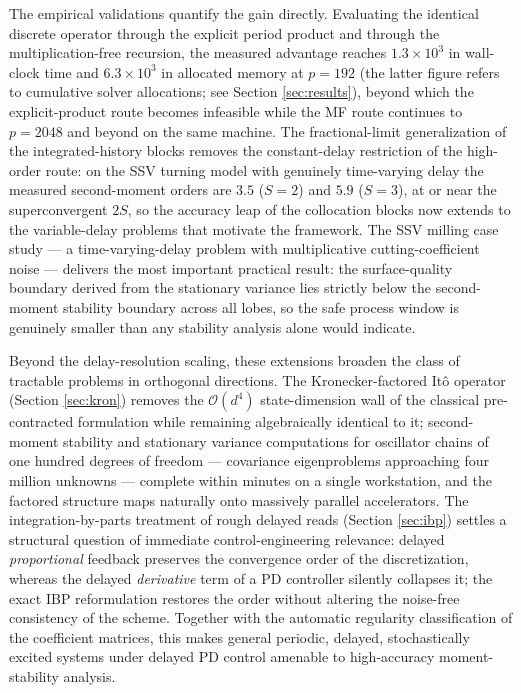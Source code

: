 \documentclass[preprint,12pt]{elsarticle}
\begin{document}
The empirical validations quantify the gain directly. Evaluating the identical discrete operator through the explicit period product and through the multiplication-free recursion, the measured advantage reaches $1.3\times10^3$ in wall-clock time and $6.3\times10^3$ in allocated memory at $p = 192$ (the latter figure refers to cumulative solver allocations; see Section \ref{sec:results}), beyond which the explicit-product route becomes infeasible while the MF route continues to $p = 2048$ and beyond on the same machine. The fractional-limit generalization of the integrated-history blocks removes the constant-delay restriction of the high-order route: on the SSV turning model with genuinely time-varying delay the measured second-moment orders are $3.5$ ($S{=}2$) and $5.9$ ($S{=}3$), at or near the superconvergent $2S$, so the accuracy leap of the collocation blocks now extends to the variable-delay problems that motivate the framework. The SSV milling case study --- a time-varying-delay problem with multiplicative cutting-coefficient noise --- delivers the most important practical result: the surface-quality boundary derived from the stationary variance lies strictly below the second-moment stability boundary across all lobes, so the safe process window is genuinely smaller than any stability analysis alone would indicate.

Beyond the delay-resolution scaling, these extensions broaden the class of tractable problems in orthogonal directions. The Kronecker-factored It\^o operator (Section \ref{sec:kron}) removes the $\mathcal{O}(d^4)$ state-dimension wall of the classical pre-contracted formulation while remaining algebraically identical to it; second-moment stability and stationary variance computations for oscillator chains of one hundred degrees of freedom --- covariance eigenproblems approaching four million unknowns --- complete within minutes on a single workstation, and the factored structure maps naturally onto massively parallel accelerators. The integration-by-parts treatment of rough delayed reads (Section \ref{sec:ibp}) settles a structural question of immediate control-engineering relevance: delayed \emph{proportional} feedback preserves the convergence order of the discretization, whereas the delayed \emph{derivative} term of a PD controller silently collapses it; the exact IBP reformulation restores the order without altering the noise-free consistency of the scheme. Together with the automatic regularity classification of the coefficient matrices, this makes general periodic, delayed, stochastically excited systems under delayed PD control amenable to high-accuracy moment-stability analysis.
\end{document}
